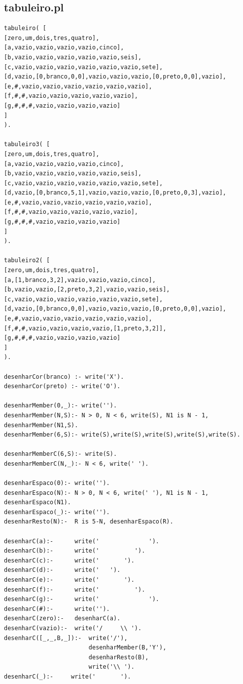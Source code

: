 \documentclass[a4paper]{article}
\begin{document}
\subsection{tabuleiro.pl}
\begin{lstlisting}
tabuleiro( [
[zero,um,dois,tres,quatro],
[a,vazio,vazio,vazio,vazio,cinco],
[b,vazio,vazio,vazio,vazio,vazio,seis],
[c,vazio,vazio,vazio,vazio,vazio,vazio,sete],
[d,vazio,[0,branco,0,0],vazio,vazio,vazio,[0,preto,0,0],vazio],
[e,#,vazio,vazio,vazio,vazio,vazio,vazio],
[f,#,#,vazio,vazio,vazio,vazio,vazio],
[g,#,#,#,vazio,vazio,vazio,vazio]
]
).

tabuleiro3( [
[zero,um,dois,tres,quatro],
[a,vazio,vazio,vazio,vazio,cinco],
[b,vazio,vazio,vazio,vazio,vazio,seis],
[c,vazio,vazio,vazio,vazio,vazio,vazio,sete],
[d,vazio,[0,branco,5,1],vazio,vazio,vazio,[0,preto,0,3],vazio],
[e,#,vazio,vazio,vazio,vazio,vazio,vazio],
[f,#,#,vazio,vazio,vazio,vazio,vazio],
[g,#,#,#,vazio,vazio,vazio,vazio]
]
).

tabuleiro2( [
[zero,um,dois,tres,quatro],
[a,[1,branco,3,2],vazio,vazio,vazio,cinco],
[b,vazio,vazio,[2,preto,3,2],vazio,vazio,seis],
[c,vazio,vazio,vazio,vazio,vazio,vazio,sete],
[d,vazio,[0,branco,0,0],vazio,vazio,vazio,[0,preto,0,0],vazio],
[e,#,vazio,vazio,vazio,vazio,vazio,vazio],
[f,#,#,vazio,vazio,vazio,vazio,[1,preto,3,2]],
[g,#,#,#,vazio,vazio,vazio,vazio]
]
).

desenharCor(branco) :- write('X').
desenharCor(preto) :- write('O').

desenharMember(0,_):- write('').
desenharMember(N,S):- N > 0, N < 6, write(S), N1 is N - 1, desenharMember(N1,S).
desenharMember(6,S):- write(S),write(S),write(S),write(S),write(S).

desenharMemberC(6,S):- write(S).
desenharMemberC(N,_):- N < 6, write(' ').

desenharEspaco(0):- write('').
desenharEspaco(N):- N > 0, N < 6, write(' '), N1 is N - 1, desenharEspaco(N1).
desenharEspaco(_):- write('').
desenharResto(N):-  R is 5-N, desenharEspaco(R).

desenharC(a):-      write('              ').
desenharC(b):-      write('          ').
desenharC(c):-      write('       ').
desenharC(d):-      write('   ').
desenharC(e):-      write('       ').
desenharC(f):-      write('          ').
desenharC(g):-      write('              ').
desenharC(#):-      write('').
desenharC(zero):-   desenharC(a).
desenharC(vazio):-  write('/     \\ ').
desenharC([_,_,B,_]):-  write('/'),
                        desenharMember(B,'Y'),
                        desenharResto(B),
                        write('\\ ').
desenharC(_):-     write('       ').


\end{lstlisting}
\end{document}
